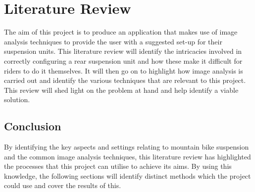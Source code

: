 \section{Literature Review}\label{sec:lit_review}
	The aim of this project is to produce an application that makes use of image analysis techniques to provide the user with a suggested set-up for their suspension units. This literature review will identify the intricacies involved in correctly configuring a rear suspension unit and how these make it difficult for riders to do it themselves. It will then go on to highlight how image analysis is carried out and identify the various techniques that are relevant to this project. This review will shed light on the problem at hand and help identify a viable solution.
	
	
	
	
	
	
	\subsection{Conclusion}
		By identifying the key aspects and settings relating to mountain bike suspension and the common image analysis techniques, this literature review has highlighted the processes that this project can utilise to achieve its aims. By using this knowledge, the following sections will identify distinct methods which the project could use and cover the results of this.